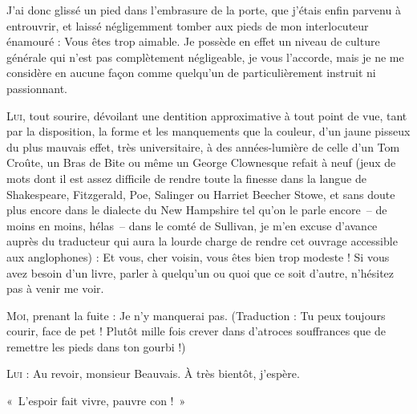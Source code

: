 J’ai donc glissé un pied dans l’embrasure de la porte, que j’étais enfin parvenu à entrouvrir, et laissé négligemment tomber aux pieds de mon interlocuteur énamouré : Vous êtes trop aimable. Je possède en effet un niveau de culture générale qui n’est pas complètement négligeable, je vous l’accorde, mais je ne me considère en aucune façon comme quelqu’un de particulièrement instruit ni passionnant.

\begin{dialogue}
    
\textsc{Lui}, tout sourire, dévoilant une dentition approximative à tout point de vue, tant par la disposition, la forme et les manquements que la couleur, d’un jaune pisseux du plus mauvais effet, très universitaire, à des années-lumière de celle d’un Tom Croûte, un Bras de Bite ou même un George Clownesque refait à neuf (jeux de mots dont il est assez difficile de rendre toute la finesse dans la langue de Shakespeare, Fitzgerald, Poe, Salinger ou Harriet Beecher Stowe, et sans doute plus encore dans le dialecte du New Hampshire tel qu’on le parle encore~-- de moins en moins, hélas~-- dans le comté de Sullivan, je m’en excuse d’avance auprès du traducteur qui aura la lourde charge de rendre cet ouvrage accessible aux anglophones) : Et vous, cher voisin, vous êtes bien trop modeste ! Si vous avez besoin d’un livre, parler à quelqu’un ou quoi que ce soit d’autre, n’hésitez pas à venir me voir.

\textsc{Moi}, prenant la fuite : Je n’y manquerai pas. (Traduction : Tu peux toujours courir, face de pet ! Plutôt mille fois crever dans d’atroces souffrances que de remettre les pieds dans ton gourbi !)

\textsc{Lui} : Au revoir, monsieur Beauvais. À très bientôt, j’espère.

«~L’espoir fait vivre, pauvre con !~»

\end{dialogue}
    

